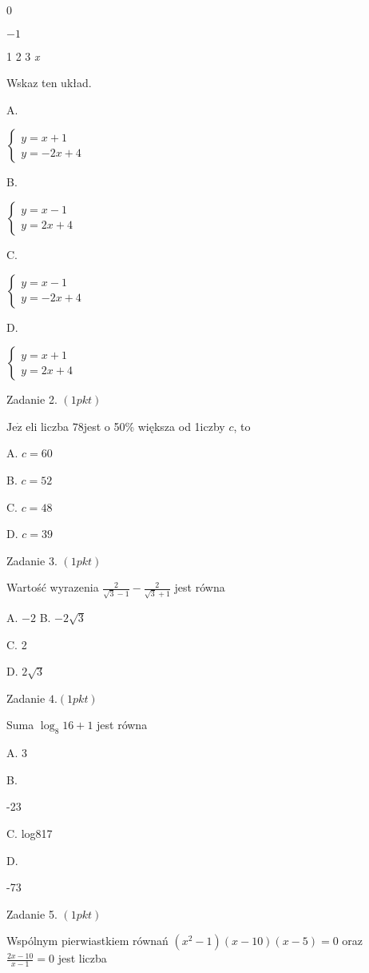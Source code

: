 \documentclass[a4paper,12pt]{article}
\begin{document}
0

$-1$

1 2 3  {\it x}

Wskaz ten układ.

A.

$\left\{\begin{array}{l}
y=x+1\\
y=-2x+4
\end{array}\right.$

B.

$\left\{\begin{array}{l}
y=x-1\\
y=2x+4
\end{array}\right.$

C.

$\left\{\begin{array}{l}
y=x-1\\
y=-2x+4
\end{array}\right.$

D.

$\left\{\begin{array}{l}
y=x+1\\
y=2x+4
\end{array}\right.$

Zadanie 2. $(1pkt)$

$\mathrm{J}\mathrm{e}\dot{\mathrm{z}}$ eli liczba $78$jest o 50\% większa od 1iczby $c$, to

A. $c=60$

B. $c=52$

C. $c=48$

D. $c=39$

Zadanie 3. $(1pkt)$

Wartość wyrazenia $\displaystyle \frac{2}{\sqrt{3}-1}-\frac{2}{\sqrt{3}+1}$ jest równa

A. $-2$ B. $-2\sqrt{3}$

C. 2

D. $2\sqrt{3}$

Zadanie $4.(1pkt)$

Suma $\log_{8}16+1$ jest równa

A. 3

B.

-23

C. log817

D.

-73

Zadanie 5. $(1pkt)$

Wspólnym pierwiastkiem równań $(x^{2}-1)(x-10)(x-5)=0$ oraz $\displaystyle \frac{2x-10}{x-1}=0$ jest liczba
\end{document}
